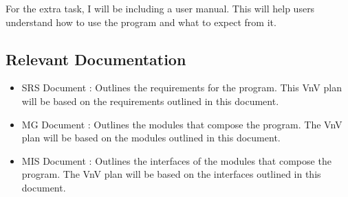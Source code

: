 \documentclass[12pt, titlepage]{article}
\begin{document}
For the extra task, I will be including a user manual. This will help users
understand how to use the program and what to expect from it.



\subsection{Relevant Documentation}


  \begin{itemize}
    \item SRS Document \citep{SRS}: Outlines the requirements for the \progname{}
    program. This VnV plan will be based on the requirements outlined in this
    document.
    \item MG Document \citep{MG}: Outlines the modules that compose the \progname{} program.
    The VnV plan will be based on the modules outlined in this document.
    \item MIS Document \citep{MIS}: Outlines the interfaces of the modules that compose the
    \progname{} program. The VnV plan will be based on the interfaces outlined in
    this document.
  \end{itemize}
\end{document}
